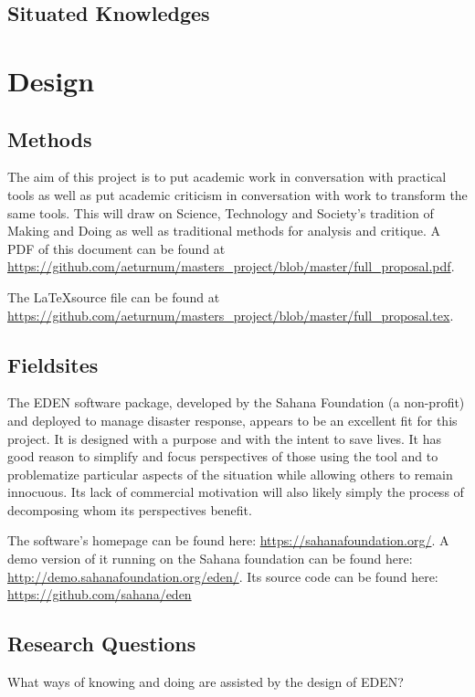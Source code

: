 \documentclass[a4paper,man,natbib]{apa6}
\begin{document}
   \subsection*{Situated Knowledges}
   \section*{Design}
   \subsection*{Methods}
   The aim of this project is to put academic work in conversation with practical tools as well as put academic criticism in conversation with work to  transform the same tools. This will draw on Science, Technology and Society's tradition of Making and Doing as well as traditional methods for analysis and critique.
   A PDF of this document can be found at \url{https://github.com/aeturnum/masters_project/blob/master/full_proposal.pdf}.

   The \LaTeX source file can be found at \url{https://github.com/aeturnum/masters_project/blob/master/full_proposal.tex}.
   \subsection*{Fieldsites}

   The EDEN software package, developed by the Sahana Foundation (a non-profit) and deployed to manage disaster response, appears to be an excellent fit for this project. It is designed with a purpose and with the intent to save lives. It has good reason to simplify and focus perspectives of those using the tool and to problematize particular aspects of the situation while allowing others to remain innocuous. Its lack of commercial motivation will also likely simply the process of decomposing whom its perspectives benefit.

   The software's homepage can be found here: \url{https://sahanafoundation.org/}. A demo version of it running on the Sahana foundation can be found here: \url{http://demo.sahanafoundation.org/eden/}. Its source code can be found here: \url{https://github.com/sahana/eden}
   \subsection*{Research Questions}
   What ways of knowing and doing are assisted by the design of EDEN?
\end{document}
